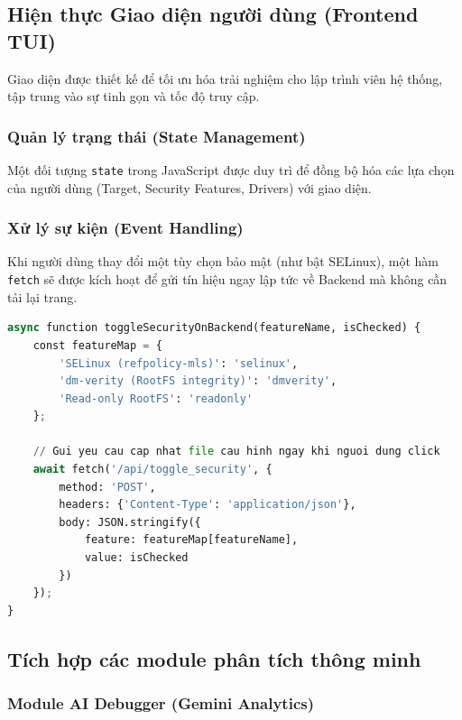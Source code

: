 \subsection{Hiện thực Giao diện người dùng (Frontend TUI)}

Giao diện được thiết kế để tối ưu hóa trải nghiệm cho lập trình viên hệ thống, tập trung vào sự tinh gọn và tốc độ truy cập.

\subsubsection{Quản lý trạng thái (State Management)}

Một đối tượng \texttt{state} trong JavaScript được duy trì để đồng bộ hóa các lựa chọn của người dùng (Target, Security Features, Drivers) với giao diện.

\subsubsection{Xử lý sự kiện (Event Handling)}

Khi người dùng thay đổi một tùy chọn bảo mật (như bật SELinux), một hàm \texttt{fetch} sẽ được kích hoạt để gửi tín hiệu ngay lập tức về Backend mà không cần tải lại trang.

\begin{lstlisting}[style=thesisstyle, language=Python]
async function toggleSecurityOnBackend(featureName, isChecked) {
    const featureMap = {
        'SELinux (refpolicy-mls)': 'selinux',
        'dm-verity (RootFS integrity)': 'dmverity',
        'Read-only RootFS': 'readonly'
    };

    // Gui yeu cau cap nhat file cau hinh ngay khi nguoi dung click
    await fetch('/api/toggle_security', {
        method: 'POST',
        headers: {'Content-Type': 'application/json'},
        body: JSON.stringify({
            feature: featureMap[featureName],
            value: isChecked
        })
    });
}
\end{lstlisting}

\subsection{Tích hợp các module phân tích thông minh}

\subsubsection{Module AI Debugger (Gemini Analytics)}


